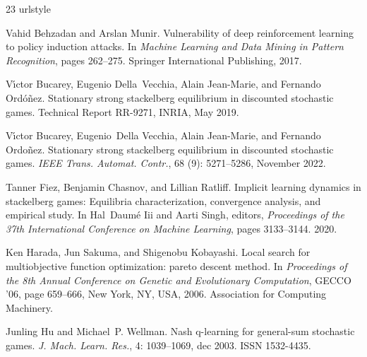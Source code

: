 \documentclass{acml}
\begin{document}
\begin{thebibliography}{23}
\providecommand{\natexlab}[1]{#1}
\providecommand{\url}[1]{\texttt{#1}}
\expandafter\ifx\csname urlstyle\endcsname\relax
  \providecommand{\doi}[1]{doi: #1}\else
  \providecommand{\doi}{doi: \begingroup \urlstyle{rm}\Url}\fi

Vahid Behzadan and Arslan Munir.
\newblock Vulnerability of deep reinforcement learning to policy induction attacks.
\newblock In \emph{Machine Learning and Data Mining in Pattern Recognition}, pages 262--275. Springer International Publishing, 2017.

V{\'\i}ctor Bucarey, Eugenio Della~Vecchia, Alain Jean-Marie, and Fernando Ord{\'o}{\~n}ez.
\newblock Stationary strong stackelberg equilibrium in discounted stochastic games.
\newblock Technical Report RR-9271, INRIA, May 2019.

V{\'\i}ctor Bucarey, Eugenio~Della Vecchia, Alain Jean-Marie, and Fernando Ordo{\~n}ez.
\newblock Stationary strong stackelberg equilibrium in discounted stochastic games.
\newblock \emph{IEEE Trans. Automat. Contr.}, 68 (9): 5271--5286, November 2022.

Tanner Fiez, Benjamin Chasnov, and Lillian Ratliff.
\newblock Implicit learning dynamics in stackelberg games: Equilibria characterization, convergence analysis, and empirical study.
\newblock In Hal~Daumé Iii and Aarti Singh, editors, \emph{Proceedings of the 37th International Conference on Machine Learning}, pages 3133--3144.  2020.

Ken Harada, Jun Sakuma, and Shigenobu Kobayashi.
\newblock Local search for multiobjective function optimization: pareto descent method.
\newblock In \emph{Proceedings of the 8th Annual Conference on Genetic and Evolutionary Computation}, GECCO '06, page 659–666, New York, NY, USA, 2006. Association for Computing Machinery.

Junling Hu and Michael~P. Wellman.
\newblock Nash q-learning for general-sum stochastic games.
\newblock \emph{J. Mach. Learn. Res.}, 4: 1039–1069, dec 2003.
\newblock ISSN 1532-4435.


\end{thebibliography}
\end{document}
